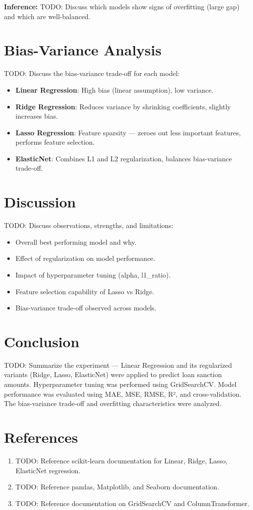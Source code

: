 \documentclass[12pt,a4paper]{article}
\begin{document}
\textbf{Inference:}
TODO: Discuss which models show signs of overfitting (large gap) and which are well-balanced.

\section{Bias-Variance Analysis}
TODO: Discuss the bias-variance trade-off for each model:

\begin{itemize}
    \item \textbf{Linear Regression}: High bias (linear assumption), low variance.
    \item \textbf{Ridge Regression}: Reduces variance by shrinking coefficients, slightly increases bias.
    \item \textbf{Lasso Regression}: Feature sparsity — zeroes out less important features, performs feature selection.
    \item \textbf{ElasticNet}: Combines L1 and L2 regularization, balances bias-variance trade-off.
\end{itemize}

\section{Discussion}
TODO: Discuss observations, strengths, and limitations:
\begin{itemize}
    \item Overall best performing model and why.
    \item Effect of regularization on model performance.
    \item Impact of hyperparameter tuning (alpha, l1\_ratio).
    \item Feature selection capability of Lasso vs Ridge.
    \item Bias-variance trade-off observed across models.
\end{itemize}

\section{Conclusion}
TODO: Summarize the experiment — Linear Regression and its regularized variants (Ridge, Lasso, ElasticNet) were applied to predict loan sanction amounts. Hyperparameter tuning was performed using GridSearchCV. Model performance was evaluated using MAE, MSE, RMSE, R², and cross-validation. The bias-variance trade-off and overfitting characteristics were analyzed.

\section{References}
\begin{enumerate}
    \item TODO: Reference scikit-learn documentation for Linear, Ridge, Lasso, ElasticNet regression.
    \item TODO: Reference pandas, Matplotlib, and Seaborn documentation.
    \item TODO: Reference documentation on GridSearchCV and ColumnTransformer.
\end{enumerate}
\end{document}
